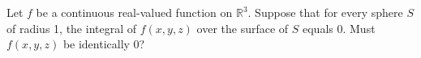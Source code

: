 Let $f$ be a continuous real-valued function on $\mathbb{R}^3$. Suppose that for every sphere $S$ of radius 1,
the integral of $f(x,y,z)$ over the surface of $S$ equals 0. Must $f(x,y,z)$ be identically 0?
